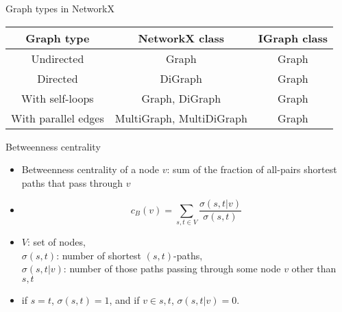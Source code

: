 \documentclass[12pt]{beamer}
\begin{document}
	\begin{frame}{Graph types in NetworkX}
		\centering
		\begin{tabular}[]{c|c|c}
			Graph type & NetworkX class & IGraph class \\
			\hline
			Undirected & Graph & Graph \\
			Directed & DiGraph & Graph \\
			With self-loops & Graph, DiGraph & Graph \\
			With parallel edges & MultiGraph, MultiDiGraph & Graph
		\end{tabular}
	\end{frame}
	\begin{frame}{Betweenness centrality}
		\begin{itemize}
			\item Betweenness centrality of a node $v$: sum of the
			fraction of all-pairs shortest paths that pass through $v$
			\item 		
			\begin{equation*}
			c_B(v) =\sum_{s,t \in V} \frac{\sigma(s, t|v)}{\sigma(s, t)}
			\end{equation*}	
			\item  $V$: set of nodes,\\
			$\sigma(s, t)$: number of
			shortest $(s, t)$-paths, \\
			$\sigma(s, t|v)$: number of those
			paths  passing through some  node $v$ other than $s, t$
			\item if $s = t$, $\sigma(s, t) = 1$, and if $v \in {s, t}$,
			$\sigma(s, t|v) = 0$.
		\end{itemize}
	\end{frame}
\end{document}
